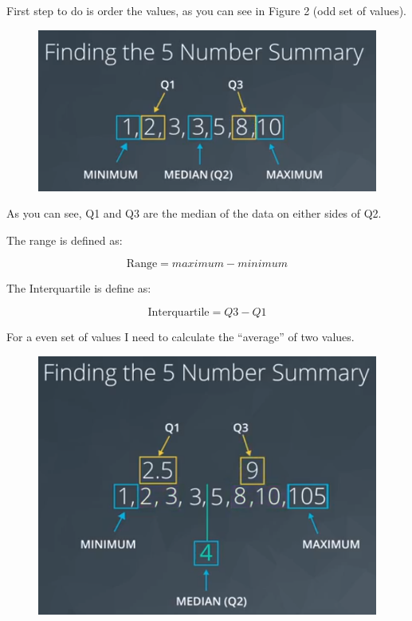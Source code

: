 \documentclass[]{book}
\begin{document}
First step to do is order the values, as you can see in Figure 2 (odd
set of values).

\begin{figure}
\centering
\includegraphics{01-img/c4_l2_02.png}
\caption{}
\end{figure}

As you can see, Q1 and Q3 are the median of the data on either sides of
Q2.

The range is defined as:

\[ \text{Range} = maximum - minimum \tag{1}\]

The Interquartile is define as:

\[ \text{Interquartile} = Q3 - Q1 \tag{2}\]

For a even set of values I need to calculate the ``average'' of two
values.

\begin{figure}
\centering
\includegraphics{01-img/c4_l2_03.png}
\caption{}
\end{figure}
\end{document}
